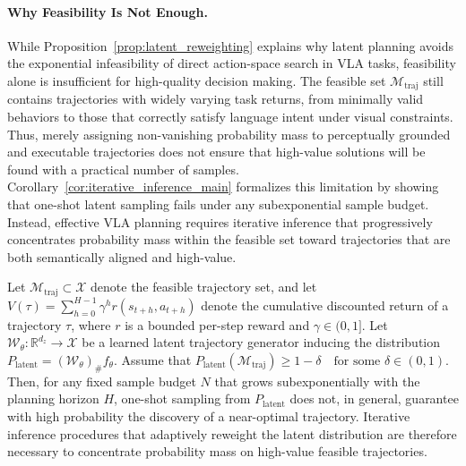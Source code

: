 \paragraph{Why Feasibility Is Not Enough.}
While Proposition~\ref{prop:latent_reweighting} explains why latent planning avoids the exponential infeasibility of direct action-space search in VLA tasks, feasibility alone is insufficient for high-quality decision making.
The feasible set $\mathcal{M}_{\mathrm{traj}}$ still contains trajectories with widely varying task returns, from minimally valid behaviors to those that correctly satisfy language intent under visual constraints.
Thus, merely assigning non-vanishing probability mass to perceptually grounded and executable trajectories does not ensure that high-value solutions will be found with a practical number of samples.
Corollary~\ref{cor:iterative_inference_main} formalizes this limitation by showing that one-shot latent sampling fails under any subexponential sample budget.
Instead, effective VLA planning requires iterative inference that progressively concentrates probability mass within the feasible set toward trajectories that are both semantically aligned and high-value.

\begin{corollary}
\label{cor:iterative_inference_main}
Let $\mathcal{M}_{\mathrm{traj}} \subset \mathcal{X}$ denote the feasible trajectory set,
and let
$
V(\tau)
=
\sum_{h=0}^{H-1} \gamma^h r(s_{t+h}, a_{t+h})
$
denote the cumulative discounted return of a trajectory $\tau$,
where $r$ is a bounded per-step reward and $\gamma \in (0,1]$.
Let
$\mathcal{W}_\theta : \mathbb{R}^{d_z} \to \mathcal{X}$
be a learned latent trajectory generator inducing the distribution
$P_{\mathrm{latent}} = (\mathcal{W}_\theta)_\# f_\theta$.
Assume that
$
P_{\mathrm{latent}}(\mathcal{M}_{\mathrm{traj}}) \ge 1 - \delta
\quad \text{for some } \delta \in (0,1).
$
Then, for any fixed sample budget $N$ that grows subexponentially with
the planning horizon $H$, one-shot sampling from $P_{\mathrm{latent}}$
does not, in general, guarantee with high probability
the discovery of a near-optimal trajectory.
Iterative inference procedures that adaptively reweight
the latent distribution are therefore necessary
to concentrate probability mass on high-value feasible trajectories.
\end{corollary}

